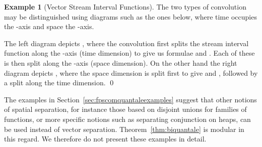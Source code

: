\documentclass[12pt]{article}
\theoremstyle{definition}
\newtheorem{example}{Example}
\begin{document}
\begin{example}[Vector Stream Interval Functions]
  The two types of convolution may be distinguished using diagrams
  such as the ones below, where time occupies the -axis and space
  the -axis. 
  \begin{center}
  \end{center}
  The left diagram depicts , where the
  convolution first splits the stream interval function along the
  -axis (time dimension) to give us formulae  and . Each of these is then split along the -axis (space
  dimension). On the other hand the right diagram depicts , where the space dimension is split first to give
   and , followed by a split along the time
  dimension.  \qed
\end{example}
The examples in Section~\ref{sec:fpscomquantaleexamples} suggest that
other notions of spatial separation, for instance those based on
disjoint unions for families of functions, or more specific notions
such as separating conjunction on heaps, can be used instead of vector
separation.  Theorem~\ref{thm:biquantale} is modular in this
regard. We therefore do not present these examples in detail.
\end{document}
